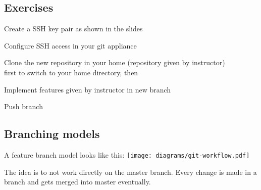 \subsection{Exercises}
\begin{frame}[fragile]
  \subslidetitle
  \begin{exercise}
    \item Create a SSH key pair as shown in the slides
    \item Configure SSH access in your git appliance
    \item Clone the new repository in your home (repository given by instructor)\\
       first to switch to your home directory, then\\
    \item Implement features given by instructor in new branch
    \item Push branch
  \end{exercise}
\end{frame}

\subsection{Branching models}
\begin{frame}[fragile]
  \subslidetitle
  A feature branch model looks like this:
  \center \texttt{[image: diagrams/git-workflow.pdf]}

  \vspace{2em}
  The idea is to not work directly on the master branch. Every change is made in a branch and gets merged into master eventually.
\end{frame}

